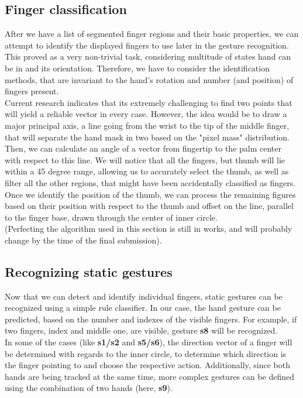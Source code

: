 \documentclass[a4paper,11pt,oneside]{article}
\begin{document}
\subsection{Finger classification}

After we have a list of segmented finger regions and their basic properties, we can attempt to identify the displayed fingers to use later in the gesture recognition. This proved as a very non-trivial task, considering multitude of states hand can be in and its orientation. Therefore, we have to consider the identification methods, that are invariant to the hand's rotation and number (and position) of fingers present.\\

Current research indicates that its extremely challenging to find two points that will yield a reliable vector in every case. However, the idea would be to draw a major principal axis, a line going from the wrist to the tip of the middle finger, that will separate the hand mask in two based on the "pixel mass" distribution. Then, we can calculate an angle of a vector from fingertip to the palm center with respect to this line. We will notice that all the fingers, but thumb will lie within a 45 degree range, allowing us to accurately select the thumb, as well as filter all the other regions, that might have been accidentally classified as fingers. Once we identify the position of the thumb, we can process the remaining figures based on their position with respect to the thumb and offset on the line, parallel to the finger base, drawn through the center of inner circle.\\

(Perfecting the algorithm used in this section is still in works, and will probably change by the time of the final submission).
 
  \subsection{Recognizing static gestures}
  
Now that we can detect and identify individual fingers, static gestures can be recognized using a simple rule classifier. In our case, the hand gesture can be predicted, based on the number and indexes of the visible fingers. For example, if two fingers, index and middle one, are visible, gesture \textbf{s8} will be recognized.\\

In some of the cases (like \textbf{s1/s2} and \textbf{s5/s6}), the direction vector of a finger will be determined with regards to the inner circle, to determine which direction is the finger pointing to and choose the respective action. Additionally, since both hands are being tracked at the same time, more complex gestures can be defined using the combination of two hands (here, \textbf{s9}).
\end{document}
